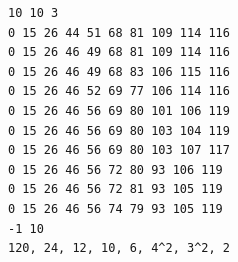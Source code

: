 \begin{verbatim}
10 10 3
0 15 26 44 51 68 81 109 114 116 
0 15 26 46 49 68 81 109 114 116 
0 15 26 46 49 68 83 106 115 116 
0 15 26 46 52 69 77 106 114 116 
0 15 26 46 56 69 80 101 106 119 
0 15 26 46 56 69 80 103 104 119 
0 15 26 46 56 69 80 103 107 117 
0 15 26 46 56 72 80 93 106 119 
0 15 26 46 56 72 81 93 105 119 
0 15 26 46 56 74 79 93 105 119 
-1 10
120, 24, 12, 10, 6, 4^2, 3^2, 2
\end{verbatim}

